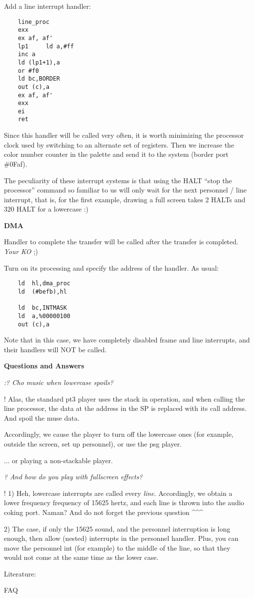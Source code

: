 \documentclass{article}
\begin{document}
Add a line interrupt handler:

\begin{verbatim}
    line_proc
    exx
    ex af, af'
    lp1		ld a,#ff
    inc a
    ld (lp1+1),a
    or #f0
    ld bc,BORDER
    out (c),a
    ex af, af'
    exx
    ei
    ret
\end{verbatim}

Since this handler will be called very often, it is worth minimizing
the processor clock used by switching to an alternate set of
registers. Then we increase the color number counter in the palette
and send it to the system (border port \#0Faf).

The peculiarity of these interrupt systems is that using the HALT
“stop the processor” command so familiar to us will only wait for the
next personnel / line interrupt, that is, for the first example,
drawing a full screen takes 2 HALTs and 320 HALT for a lowercase :)

\textbf{DMA}

Handler to complete the transfer will be called after the transfer is
completed. \emph{Your KO };)

Turn on its processing and specify the address of the handler. As
usual:

\begin{verbatim}
    ld	hl,dma_proc
    ld	(#befb),hl

    ld	bc,INTMASK
    ld	a,%00000100
    out	(c),a
\end{verbatim}

Note that in this case, we have completely disabled frame and line
interrupts, and their handlers will NOT be called.

\textbf{Questions and Answers }

\emph{:? Cho music when lowercase spoils? }

! Alas, the standard pt3 player uses the stack in operation, and when
calling the line processor, the data at the address in the SP is
replaced with its call address. And spoil the muse data.

Accordingly, we cause the player to turn off the lowercase ones (for
example, outside the screen, set up personnel), or use the psg player.

... or playing a non-stackable player.

\emph{? And how do you play with fullscreen effects? }

! 1) Heh, lowercase interrupts are called every
\emph{line}. Accordingly, we obtain a lower frequency frequency of
15625 hertz, and each line is thrown into the audio coking
port. Naman? And do not forget the previous question \^{}\^{}\^{}

2) The case, if only the 15625 sound, and the personnel interruption
is long enough, then allow (nested) interrupts in the personnel
handler. Plus, you can move the personnel int (for example) to the
middle of the line, so that they would not come at the same time as
the lower case.

Literature:

FAQ
\end{document}
